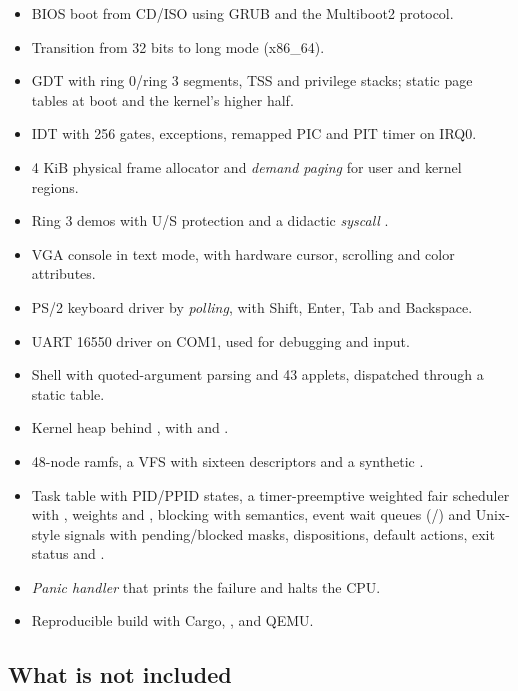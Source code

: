 \begin{itemize}
  \item BIOS boot from CD/ISO using GRUB and the Multiboot2 protocol.
  \item Transition from 32 bits to long mode (x86\_64).
  \item GDT with ring 0/ring 3 segments, TSS and privilege stacks; static
        page tables at boot and the kernel's higher half.
  \item IDT with 256 gates, exceptions, remapped PIC and PIT timer on IRQ0.
  \item 4 KiB physical frame allocator and \emph{demand paging} for user and
        kernel regions.
  \item Ring 3 demos with U/S protection and a didactic
        \emph{syscall} .
  \item VGA console in text mode, with hardware cursor, scrolling and color
        attributes.
  \item PS/2 keyboard driver by \emph{polling}, with Shift, Enter, Tab and
        Backspace.
  \item UART 16550 driver on COM1, used for debugging and input.
  \item Shell with quoted-argument parsing and 43 applets, dispatched through
        a static table.
  \item Kernel heap behind , with  and
        .
  \item 48-node ramfs, a VFS with sixteen descriptors and a synthetic
        .
  \item Task table with PID/PPID states, a timer-preemptive weighted fair
        scheduler with , weights and , blocking
         with  semantics, event wait
        queues (/) and Unix-style signals
        with pending/blocked masks, dispositions, default actions, exit
        status and .
  \item \emph{Panic handler} that prints the failure and halts the CPU.
  \item Reproducible build with Cargo, , 
        and QEMU.
\end{itemize}

\subsection*{What is not included}

